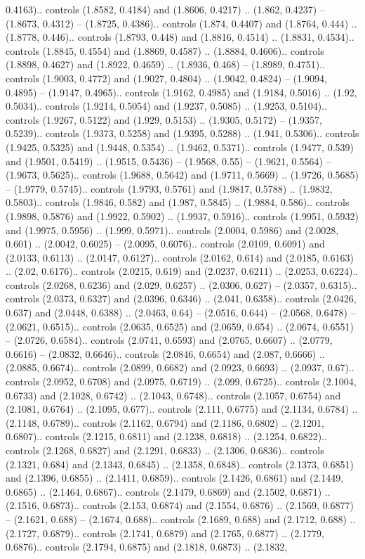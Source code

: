 0.4163).. controls (1.8582, 0.4184) and (1.8606, 0.4217) .. (1.862, 0.4237) -- (1.8673, 0.4312) -- (1.8725, 0.4386).. controls (1.874, 0.4407) and (1.8764, 0.444) .. (1.8778, 0.446).. controls (1.8793, 0.448) and (1.8816, 0.4514) .. (1.8831, 0.4534).. controls (1.8845, 0.4554) and (1.8869, 0.4587) .. (1.8884, 0.4606).. controls (1.8898, 0.4627) and (1.8922, 0.4659) .. (1.8936, 0.468) -- (1.8989, 0.4751).. controls (1.9003, 0.4772) and (1.9027, 0.4804) .. (1.9042, 0.4824) -- (1.9094, 0.4895) -- (1.9147, 0.4965).. controls (1.9162, 0.4985) and (1.9184, 0.5016) .. (1.92, 0.5034).. controls (1.9214, 0.5054) and (1.9237, 0.5085) .. (1.9253, 0.5104).. controls (1.9267, 0.5122) and (1.929, 0.5153) .. (1.9305, 0.5172) -- (1.9357, 0.5239).. controls (1.9373, 0.5258) and (1.9395, 0.5288) .. (1.941, 0.5306).. controls (1.9425, 0.5325) and (1.9448, 0.5354) .. (1.9462, 0.5371).. controls (1.9477, 0.539) and (1.9501, 0.5419) .. (1.9515, 0.5436) -- (1.9568, 0.55) -- (1.9621, 0.5564) -- (1.9673, 0.5625).. controls (1.9688, 0.5642) and (1.9711, 0.5669) .. (1.9726, 0.5685) -- (1.9779, 0.5745).. controls (1.9793, 0.5761) and (1.9817, 0.5788) .. (1.9832, 0.5803).. controls (1.9846, 0.582) and (1.987, 0.5845) .. (1.9884, 0.586).. controls (1.9898, 0.5876) and (1.9922, 0.5902) .. (1.9937, 0.5916).. controls (1.9951, 0.5932) and (1.9975, 0.5956) .. (1.999, 0.5971).. controls (2.0004, 0.5986) and (2.0028, 0.601) .. (2.0042, 0.6025) -- (2.0095, 0.6076).. controls (2.0109, 0.6091) and (2.0133, 0.6113) .. (2.0147, 0.6127).. controls (2.0162, 0.614) and (2.0185, 0.6163) .. (2.02, 0.6176).. controls (2.0215, 0.619) and (2.0237, 0.6211) .. (2.0253, 0.6224).. controls (2.0268, 0.6236) and (2.029, 0.6257) .. (2.0306, 0.627) -- (2.0357, 0.6315).. controls (2.0373, 0.6327) and (2.0396, 0.6346) .. (2.041, 0.6358).. controls (2.0426, 0.637) and (2.0448, 0.6388) .. (2.0463, 0.64) -- (2.0516, 0.644) -- (2.0568, 0.6478) -- (2.0621, 0.6515).. controls (2.0635, 0.6525) and (2.0659, 0.654) .. (2.0674, 0.6551) -- (2.0726, 0.6584).. controls (2.0741, 0.6593) and (2.0765, 0.6607) .. (2.0779, 0.6616) -- (2.0832, 0.6646).. controls (2.0846, 0.6654) and (2.087, 0.6666) .. (2.0885, 0.6674).. controls (2.0899, 0.6682) and (2.0923, 0.6693) .. (2.0937, 0.67).. controls (2.0952, 0.6708) and (2.0975, 0.6719) .. (2.099, 0.6725).. controls (2.1004, 0.6733) and (2.1028, 0.6742) .. (2.1043, 0.6748).. controls (2.1057, 0.6754) and (2.1081, 0.6764) .. (2.1095, 0.677).. controls (2.111, 0.6775) and (2.1134, 0.6784) .. (2.1148, 0.6789).. controls (2.1162, 0.6794) and (2.1186, 0.6802) .. (2.1201, 0.6807).. controls (2.1215, 0.6811) and (2.1238, 0.6818) .. (2.1254, 0.6822).. controls (2.1268, 0.6827) and (2.1291, 0.6833) .. (2.1306, 0.6836).. controls (2.1321, 0.684) and (2.1343, 0.6845) .. (2.1358, 0.6848).. controls (2.1373, 0.6851) and (2.1396, 0.6855) .. (2.1411, 0.6859).. controls (2.1426, 0.6861) and (2.1449, 0.6865) .. (2.1464, 0.6867).. controls (2.1479, 0.6869) and (2.1502, 0.6871) .. (2.1516, 0.6873).. controls (2.153, 0.6874) and (2.1554, 0.6876) .. (2.1569, 0.6877) -- (2.1621, 0.688) -- (2.1674, 0.688).. controls (2.1689, 0.688) and (2.1712, 0.688) .. (2.1727, 0.6879).. controls (2.1741, 0.6879) and (2.1765, 0.6877) .. (2.1779, 0.6876).. controls (2.1794, 0.6875) and (2.1818, 0.6873) .. (2.1832, 